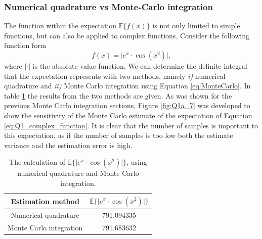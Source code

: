 \documentclass{article}
\begin{document}
\subsubsection{Numerical quadrature vs Monte-Carlo integration}
The function within the expectation $\mathbb{E}\{ f(x) \}$ is not only limited to simple functions, but can also be applied to complex functions. Consider the following function form
\begin{equation}\label{eq:Q1_complex_function}
    f(x) = \vert e^x \cdot \cos \left( x^2 \right) \vert,
\end{equation}
where $\vert \cdot \vert$ is the absolute value function. We can determine the definite integral that the expectation represents with two methods, namely \emph{i)} numerical quadrature and \emph{ii)} Monte Carlo integration using Equation \eqref{eq:MonteCarlo}. In table \ref{tab:complex_expectations} the results from the two methods are given. As was shown for the previous Monte Carlo integration sections, Figure \ref{fig:Q1a_7} was developed to show the sensitivity of the Monte Carlo estimate of the expectation of Equation \eqref{eq:Q1_complex_function}. It is clear that the number of samples is important to this expectation, as if the number of samples is too low both the estimate variance and the estimation error is high.
\begin{table}[!htb]
\centering
\caption{The calculation of $\mathbb{E}\{ \vert e^x \cdot \cos \left( x^2 \right) \vert\}$, using numerical quadrature and Monte Carlo integration.}
\label{tab:complex_expectations}
\begin{tabular}{@{}cc@{}}
\toprule
Estimation method & $\mathbb{E}\{ \vert e^x \cdot \cos \left( x^2 \right) \vert\}$ \\ \midrule
Numerical quadrature & 791.094335 \\
Monte Carlo integration & 791.683632 \\ \bottomrule
\end{tabular}
\end{table}
\end{document}
